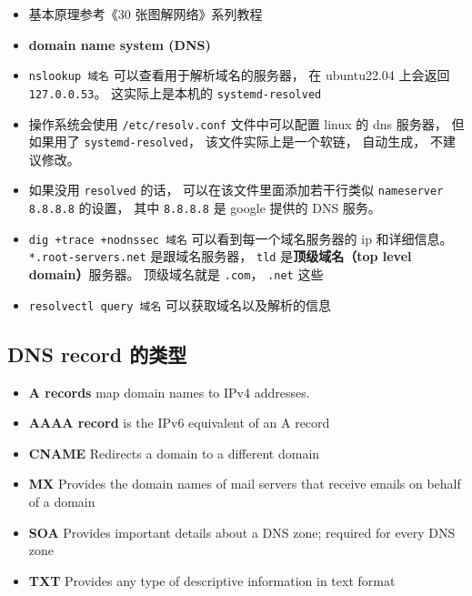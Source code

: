 
\begin{issues}
\issueDraft
\end{issues}

\begin{itemize}
\item 基本原理参考《30 张图解网络》系列教程
\item \textbf{domain name system (DNS)}
\item \verb|nslookup 域名| 可以查看用于解析域名的服务器， 在 ubuntu22.04 上会返回 \verb|127.0.0.53|。 这实际上是本机的 \verb|systemd-resolved|
\item 操作系统会使用 \verb|/etc/resolv.conf| 文件中可以配置 linux 的 dns 服务器， 但如果用了 \verb|systemd-resolved|， 该文件实际上是一个软链， 自动生成， 不建议修改。
\item 如果没用 \verb|resolved| 的话， 可以在该文件里面添加若干行类似 \verb|nameserver 8.8.8.8| 的设置， 其中 \verb|8.8.8.8| 是 google 提供的 DNS 服务。
\item \verb|dig +trace +nodnssec 域名| 可以看到每一个域名服务器的 ip 和详细信息。 \verb|*.root-servers.net| 是跟域名服务器， \verb|tld| 是\textbf{顶级域名（top level domain）}服务器。 顶级域名就是 \verb|.com|， \verb|.net| 这些
\item \verb|resolvectl query 域名| 可以获取域名以及解析的信息
\end{itemize}

\subsection{DNS record 的类型}
\begin{itemize}
\item \textbf{A records} map domain names to IPv4 addresses.
\item \textbf{AAAA record} is the IPv6 equivalent of an A record
\item \textbf{CNAME}	Redirects a domain to a different domain
\item \textbf{MX} Provides the domain names of mail servers that receive emails on behalf of a domain
\item \textbf{SOA} Provides important details about a DNS zone; required for every DNS zone
\item \textbf{TXT} Provides any type of descriptive information in text format
\end{itemize}

